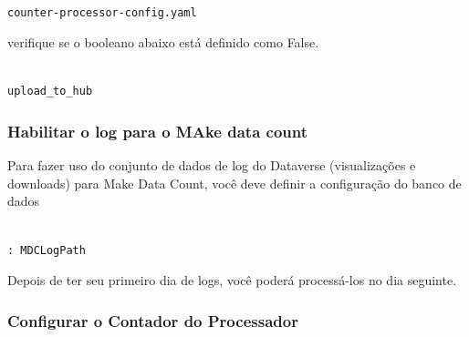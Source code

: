 \documentclass[12pt,hidelinks]{article}
\begin{document}
\begin{verbatim}

counter-processor-config.yaml

\end{verbatim}

verifique se o booleano abaixo está definido como False.

\begin{verbatim}

upload_to_hub

\end{verbatim}

\subsubsection{Habilitar o log para o MAke data count}

\qquad Para fazer uso do conjunto de dados de log do Dataverse (visualizações e downloads) para Make Data Count, você deve definir a configuração do banco de dados

\begin{verbatim}

: MDCLogPath

\end{verbatim}

Depois de ter seu primeiro dia de logs, você poderá processá-los no dia seguinte.

\subsubsection{Configurar o Contador do Processador}
\end{document}
